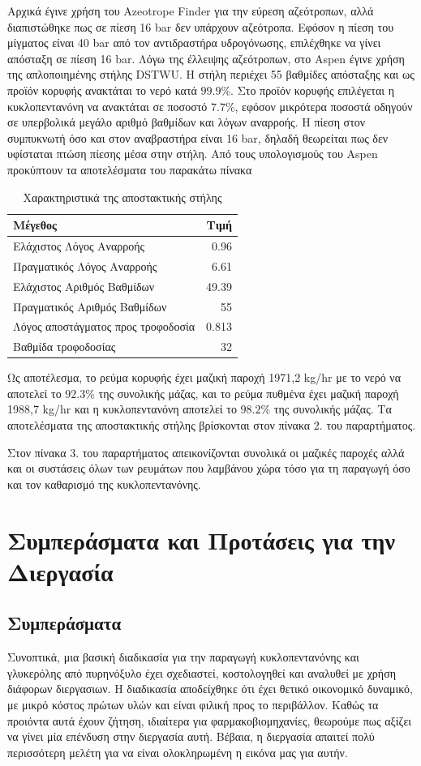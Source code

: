 \documentclass[11pt]{article}
\begin{document}
Αρχικά έγινε χρήση του Azeotrope Finder για την εύρεση αζεότροπων, αλλά
διαπιστώθηκε πως σε πίεση 16 bar δεν υπάρχουν αζεότροπα. Εφόσον η πίεση
του μίγματος είναι 40 bar από τον αντιδραστήρα υδρογόνωσης, επιλέχθηκε
να γίνει απόσταξη σε πίεση 16 bar. Λόγω της έλλειψης αζεότροπων, στο
Aspen έγινε χρήση της απλοποιημένης στήλης DSTWU. Η στήλη περιέχει 55
βαθμίδες απόσταξης και ως προϊόν κορυφής ανακτάται το νερό κατά \(99.9 \%\).
Στο προϊόν κορυφής επιλέγεται η κυκλοπεντανόνη να ανακτάται σε ποσοστό
\(7.7 \%\), εφόσον μικρότερα ποσοστά οδηγούν σε υπερβολικά μεγάλο αριθμό
βαθμίδων και λόγων αναρροής. Η πίεση στον συμπυκνωτή όσο και στον
αναβραστήρα είναι 16 bar, δηλαδή θεωρείται πως δεν υφίσταται πτώση
πίεσης μέσα στην στήλη. Από τους υπολογισμούς του Aspen προκύπτουν τα αποτελέσματα του παρακάτω πίνακα

\begin{table}[htbp]
\caption{Χαρακτηριστικά της αποστακτικής στήλης}
\centering
\begin{tabular}{lr}
Μέγεθος & Τιμή\\
\hline
Ελάχιστος Λόγος Αναρροής & 0.96\\
Πραγματικός Λόγος Αναρροής & 6.61\\
Ελάχιστος Αριθμός Βαθμίδων & 49.39\\
Πραγματικός Αριθμός Βαθμίδων & 55\\
Λόγος αποστάγματος προς τροφοδοσία & 0.813\\
Βαθμίδα τροφοδοσίας & 32\\
\end{tabular}
\end{table}

Ως αποτέλεσμα, το ρεύμα κορυφής έχει μαζική παροχή 1971,2 kg/hr με το
νερό να αποτελεί το \(92.3 \%\) της συνολικής μάζας, και το ρεύμα πυθμένα έχει
μαζική παροχή 1988,7 kg/hr και η κυκλοπεντανόνη αποτελεί το \(98.2 \%\) της
συνολικής μάζας. Τα αποτελέσματα της αποστακτικής στήλης βρίσκονται στον
πίνακα 2. του παραρτήματος.

Στον πίνακα 3. του παραρτήματος απεικονίζονται συνολικά οι μαζικές
παροχές αλλά και οι συστάσεις όλων των ρευμάτων που λαμβάνου χώρα τόσο
για τη παραγωγή όσο και τον καθαρισμό της κυκλοπεντανόνης.

\section{Συμπεράσματα και Προτάσεις για την Διεργασία}
\label{sec:org024b2ba}
\subsection{Συμπεράσματα}
\label{sec:orgc1f518c}
Συνοπτικά, μια βασική διαδικασία για την παραγωγή κυκλοπεντανόνης και γλυκερόλης από πυρηνόξυλο έχει σχεδιαστεί, κοστολογηθεί και αναλυθεί με χρήση διάφορων διεργασιων. Η διαδικασία αποδείχθηκε ότι έχει θετικό οικονομικό δυναμικό, με μικρό κόστος πρώτων υλών και είναι φιλική προς το περιβάλλον. Καθώς τα προιόντα αυτά έχουν ζήτηση, ιδιαίτερα για φαρμακοβιομηχανίες, θεωρούμε πως αξίζει να γίνει μία επένδυση στην διεργασία αυτή. Βέβαια, η διεργασία απαιτεί πολύ περισσότερη μελέτη για να είναι ολοκληρωμένη η εικόνα μας για αυτήν.
\end{document}
